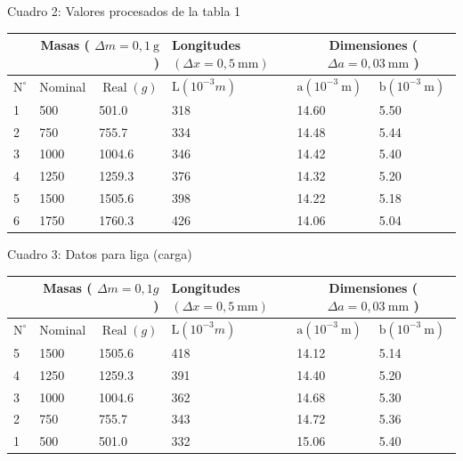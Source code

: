 \documentclass[10pt]{article}
\begin{document}
Cuadro 2: Valores procesados de la tabla 1

\begin{center}
\begin{tabular}{|l|l|l|l|l|l|}
\hline
 & \multicolumn{2}{|r|}{Masas ( $\Delta m=0,1 \mathrm{~g}$ )} & Longitudes $(\Delta x=0,5 \mathrm{~mm})$ & \multicolumn{2}{|c|}{Dimensiones ( $\Delta a=0,03 \mathrm{~mm}$ )} \\
\hline
$\mathrm{N}^{\circ}$ & Nominal & $\operatorname{Real}(g)$ & $\mathrm{L}\left(10^{-3} m\right)$ & $\mathrm{a}\left(10^{-3} \mathrm{~m}\right)$ & $\mathrm{b}\left(10^{-3} \mathrm{~m}\right)$ \\
\hline
1 & 500 & 501.0 & 318 & 14.60 & 5.50 \\
\hline
2 & 750 & 755.7 & 334 & 14.48 & 5.44 \\
\hline
3 & 1000 & 1004.6 & 346 & 14.42 & 5.40 \\
\hline
4 & 1250 & 1259.3 & 376 & 14.32 & 5.20 \\
\hline
5 & 1500 & 1505.6 & 398 & 14.22 & 5.18 \\
\hline
6 & 1750 & 1760.3 & 426 & 14.06 & 5.04 \\
\hline
\end{tabular}
\end{center}

Cuadro 3: Datos para liga (carga)

\begin{center}
\begin{tabular}{|l|l|l|l|l|l|}
\hline
 & \multicolumn{2}{|r|}{Masas ( $\Delta m=0,1 g$ )} & Longitudes $(\Delta x=0,5 \mathrm{~mm})$ & \multicolumn{2}{|c|}{Dimensiones ( $\Delta a=0,03 \mathrm{~mm}$ )} \\
\hline
$\mathrm{N}^{\circ}$ & Nominal & $\operatorname{Real}(g)$ & $\mathrm{L}\left(10^{-3} m\right)$ & $\mathrm{a}\left(10^{-3} \mathrm{~m}\right)$ & $\mathrm{b}\left(10^{-3} \mathrm{~m}\right)$ \\
\hline
5 & 1500 & 1505.6 & 418 & 14.12 & 5.14 \\
\hline
4 & 1250 & 1259.3 & 391 & 14.40 & 5.20 \\
\hline
3 & 1000 & 1004.6 & 362 & 14.68 & 5.30 \\
\hline
2 & 750 & 755.7 & 343 & 14.72 & 5.36 \\
\hline
1 & 500 & 501.0 & 332 & 15.06 & 5.40 \\
\hline
\end{tabular}
\end{center}
\end{document}

